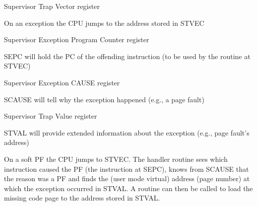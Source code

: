 \newpar{}
 Supervisor Trap Vector register

On an exception the CPU jumps to the address stored in STVEC

\newpar{}
 Supervisor Exception Program Counter register

SEPC will hold the PC of the offending instruction (to be used by the routine at STVEC)

\newpar{}
 Supervisor Exception CAUSE register

SCAUSE will tell why the exception happened (e.g., a page fault)

\newpar{}
 Supervisor Trap Value register

STVAL will provide extended information about the exception (e.g., page fault's address)

\newpar{}

On a soft PF the CPU jumps to STVEC. The handler routine sees which instruction caused the PF (the instruction at SEPC), knows from SCAUSE that the reason was a PF and finds the (user mode virtual) address (page number) at which the exception occurred in STVAL. A routine can then be called to load the missing code page to the address stored in STVAL.

